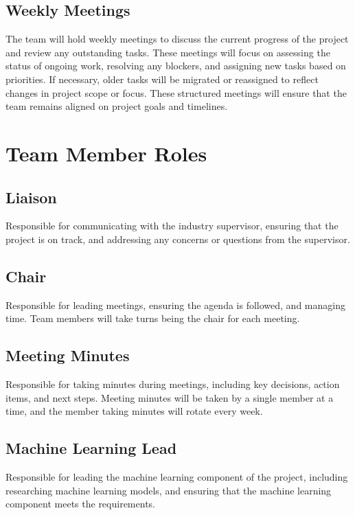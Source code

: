 \documentclass{article}
\begin{document}
\subsection*{Weekly Meetings}
The team will hold weekly meetings to discuss the current progress of the project and review any outstanding tasks. These meetings will focus on assessing the status of ongoing work, resolving any blockers, and assigning new tasks based on priorities. If necessary, older tasks will be migrated or reassigned to reflect changes in project scope or focus. These structured meetings will ensure that the team remains aligned on project goals and timelines.

\section{Team Member Roles}


\subsection*{Liaison} Responsible for communicating with the industry supervisor, ensuring that the project is on track, and addressing any concerns or questions from the supervisor.   
\subsection*{Chair} Responsible for leading meetings, ensuring the agenda is followed, and managing time. Team members will take turns being the chair for each meeting.
\subsection*{Meeting Minutes} Responsible for taking minutes during meetings, including key decisions, action items, and next steps. Meeting minutes will be taken by a single member at a time, and the member taking minutes will rotate every week.
\subsection*{Machine Learning Lead} Responsible for leading the machine learning component of the project, including researching machine learning models, and ensuring that the machine learning component meets the requirements.
\end{document}
